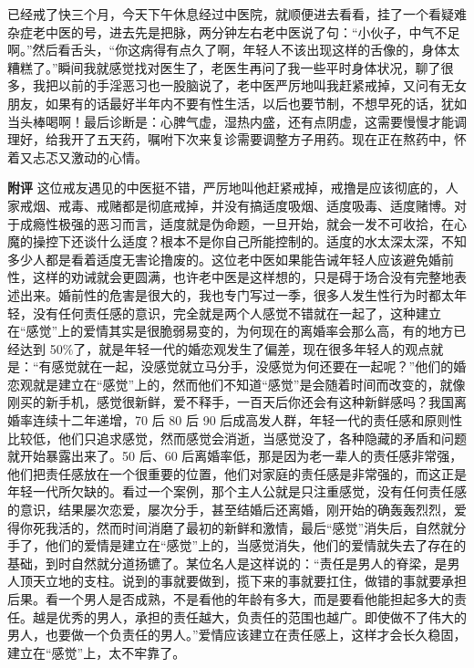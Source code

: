\begin{case}
    已经戒了快三个月，今天下午休息经过中医院，就顺便进去看看，挂了一个看疑难杂症老中医的号，进去先是把脉，两分钟左右老中医说了句：“小伙子，中气不足啊。”然后看舌头，“你这病得有点久了啊，年轻人不该出现这样的舌像的，身体太糟糕了。”瞬间我就感觉找对医生了，老医生再问了我一些平时身体状况，聊了很多，我把以前的手淫恶习也一股脑说了，老中医严厉地叫我赶紧戒掉，又问有无女朋友，如果有的话最好半年内不要有性生活，以后也要节制，不想早死的话，犹如当头棒喝啊！最后诊断是：心脾气虚，湿热内盛，还有点阴虚，这需要慢慢才能调理好，给我开了五天药，嘱咐下次来复诊需要调整方子用药。现在正在熬药中，怀着又忐忑又激动的心情。

    \textbf{附评} 这位戒友遇见的中医挺不错，严厉地叫他赶紧戒掉，戒撸是应该彻底的，人家戒烟、戒毒、戒赌都是彻底戒掉，并没有搞适度吸烟、适度吸毒、适度赌博。对于成瘾性极强的恶习而言，适度就是伪命题，一旦开始，就会一发不可收拾，在心魔的操控下还谈什么适度？根本不是你自己所能控制的。适度的水太深太深，不知多少人都是看着适度无害论撸废的。这位老中医如果能告诫年轻人应该避免婚前性，这样的劝诫就会更圆满，也许老中医是这样想的，只是碍于场合没有完整地表述出来。婚前性的危害是很大的，我也专门写过一季，很多人发生性行为时都太年轻，没有任何责任感的意识，完全就是两个人感觉不错就在一起了，这种建立在“感觉”上的爱情其实是很脆弱易变的，为何现在的离婚率会那么高，有的地方已经达到 50\%了，就是年轻一代的婚恋观发生了偏差，现在很多年轻人的观点就是：“有感觉就在一起，没感觉就立马分手，没感觉为何还要在一起呢？”他们的婚恋观就是建立在“感觉”上的，然而他们不知道“感觉”是会随着时间而改变的，就像刚买的新手机，感觉很新鲜，爱不释手，一百天后你还会有这种新鲜感吗？我国离婚率连续十二年递增，70 后 80 后 90 后成高发人群，年轻一代的责任感和原则性比较低，他们只追求感觉，然而感觉会消逝，当感觉没了，各种隐藏的矛盾和问题就开始暴露出来了。50 后、60 后离婚率低，那是因为老一辈人的责任感非常强，他们把责任感放在一个很重要的位置，他们对家庭的责任感是非常强的，而这正是年轻一代所欠缺的。看过一个案例，那个主人公就是只注重感觉，没有任何责任感的意识，结果屡次恋爱，屡次分手，甚至结婚后还离婚，刚开始的确轰轰烈烈，爱得你死我活的，然而时间消磨了最初的新鲜和激情，最后“感觉”消失后，自然就分手了，他们的爱情是建立在“感觉”上的，当感觉消失，他们的爱情就失去了存在的基础，到时自然就分道扬镳了。某位名人是这样说的：“责任是男人的脊梁，是男人顶天立地的支柱。说到的事就要做到，揽下来的事就要扛住，做错的事就要承担后果。看一个男人是否成熟，不是看他的年龄有多大，而是要看他能担起多大的责任。越是优秀的男人，承担的责任越大，负责任的范围也越广。即使做不了伟大的男人，也要做一个负责任的男人。”爱情应该建立在责任感上，这样才会长久稳固，建立在“感觉”上，太不牢靠了。


\end{case}
